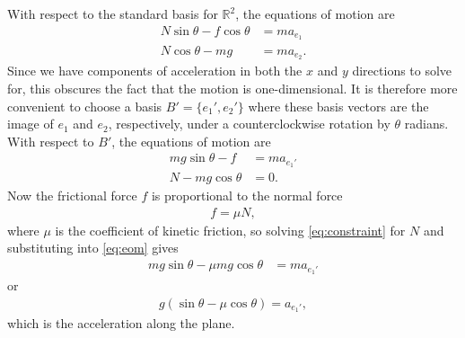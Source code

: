 \documentclass[12pt,letterpaper,reqno]{article}
\numberwithin{equation}{section}
\newcommand{\R}{\ensuremath{\mathbb R}}
\begin{document}
With respect to the standard basis for $\R^2$, the equations of motion are 
\begin{align}
N\sin \theta-f\cos\theta &=ma_{e_1} \\
N\cos \theta-mg &=ma_{e_2}. 	
\end{align}
Since we have components of acceleration in both the $x$ and $y$ directions to solve for, this obscures the fact that the motion is one-dimensional. It is therefore more convenient to choose a basis $B'=\{e_1',e_2'\}$ where these basis vectors are the image of $e_1$ and $e_2$, respectively, under a counterclockwise rotation by $\theta$ radians. With respect to $B'$, the equations of motion are
\begin{align}\label{eq:eom}
mg\sin\theta-f&=ma_{e_1'} \\ \label{eq:constraint}
N-mg\cos\theta &=0.	
\end{align}
Now the frictional force $f$ is proportional to the normal force
\begin{align*}
	f=\mu N,
\end{align*}
where $\mu$ is the coefficient of kinetic friction, so solving \eqref{eq:constraint} for $N$ and substituting into \eqref{eq:eom} gives
\begin{align*}
	mg\sin\theta-\mu mg\cos\theta &=ma_{e_1'}
\end{align*}
or 
\begin{align*}
	g(\sin\theta-\mu\cos\theta)=a_{e_1'},
\end{align*}
which is the acceleration along the plane.
\end{document}

